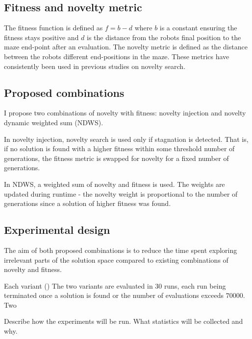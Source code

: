 \subsection{Fitness and novelty metric}
The fitness function is defined as $f = b - d$ where $b$ is a constant ensuring the fitness stays positive
and $d$ is the distance from the robots final position to the maze end-point after an evaluation.
The novelty metric is defined as the distance between the robots different end-positions in the maze.
These metrics have consistently been used in previous studies on novelty search.

\subsection{Proposed combinations}
I propose two combinations of novelty with fitness: novelty injection and novelty dynamic weighted sum (NDWS).

In novelty injection, novelty search is used only if stagnation is detected. That is, if no solution is found with a
higher fitness within some threshold number of generations, the fitness metric is swapped for novelty for a fixed
number of generations.

In NDWS, a weighted sum of novelty and fitness is used. The weights are updated during runtime - the novelty
weight is proportional to the number of generations since a solution of higher fitness was found.

\subsection{Experimental design}
The aim of both proposed combinations is to reduce the time spent exploring irrelevant parts of the solution space
compared to existing combinations of novelty and fitness.

Each variant ()
The two variants are evaluated in 30 runs, each run being terminated once a solution is found
or the number of evaluations exceeds $70 000$. Two

Describe how the experiments will be run. What statistics will be collected and why.
